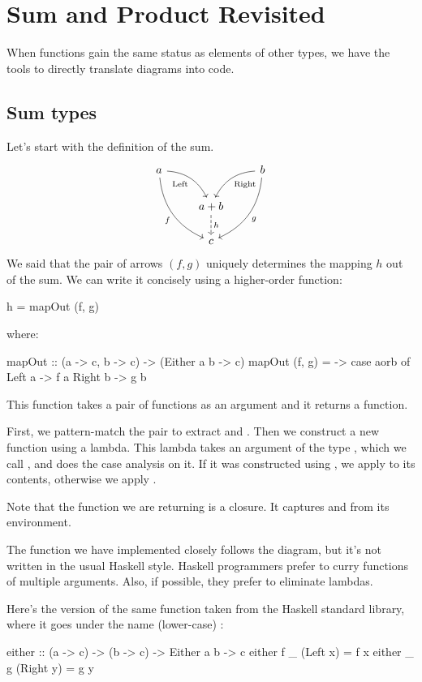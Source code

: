 \documentclass[DaoFP]{subfiles}
\begin{document}
\section{Sum and Product Revisited}

When functions gain the same status as elements of other types, we have the tools to directly translate diagrams into code. 

\subsection{Sum types}

Let's start with the definition of the sum.
\[
 \begin{tikzcd}
 a
 \arrow[dr,  bend left, "\text{Left}"']
 \arrow[ddr, bend right, "f"']
 && b
 \arrow[dl, bend right, "\text{Right}"]
 \arrow[ddl, bend left, "g"]
 \\
&a + b
\arrow[d, dashed, "h"]
\\
& c
 \end{tikzcd}
\]
We said that the pair of arrows $(f, g)$ uniquely determines the mapping $h$ out of the sum. We can write it concisely using a higher-order function:
\begin{haskell}
h = mapOut (f, g)
\end{haskell}
where:
\begin{haskell}
mapOut :: (a -> c, b -> c) -> (Either a b -> c)
mapOut (f, g) = \aorb -> case aorb of
                         Left  a -> f a
                         Right b -> g b
\end{haskell}
This function takes a pair of functions as an argument and it returns a function. 

First, we pattern-match the pair  to extract  and . Then we construct a new function using a lambda. This lambda takes an argument of the type , which we call , and does the case analysis on it. If it was constructed using , we apply  to its contents, otherwise we apply . 

Note that the function we are returning is a closure. It captures  and  from its environment. 

The function we have implemented closely follows the diagram, but it's not written in the usual Haskell style. Haskell programmers prefer to curry functions of multiple arguments. Also, if possible, they prefer to eliminate lambdas. 

Here's the version of the same function taken from the Haskell standard library, where it goes under the name (lower-case) :
\begin{haskell}
either :: (a -> c) -> (b -> c) -> Either a b -> c
either f _ (Left x)     =  f x
either _ g (Right y)    =  g y
\end{haskell}
\end{document}
